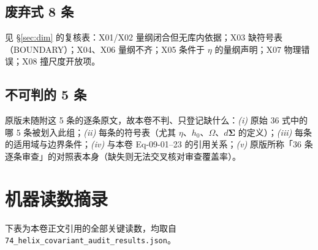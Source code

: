 \documentclass[UTF8,fontset=fandol,11pt]{ctexart}
\newcommand{\bx}{\boldsymbol}
\newcommand{\code}[1]{\texttt{#1}}
\begin{document}
\subsection{废弃式 8 条}
见 \S\ref{sec:dim} 的复核表：X01/X02 量纲闭合但无库内依据；X03 缺符号表（BOUNDARY）；X04、X06 量纲不齐；X05 条件于 $\eta$ 的量纲声明；X07 物理错误；X08 撞尺度开放项。

\subsection{不可判的 5 条}
原版未随附这 5 条的逐条原文，故本卷不判、只登记缺什么：\emph{(i)} 原始 36 式中的哪 5 条被划入此组；\emph{(ii)} 每条的符号表（尤其 $\eta$、$h_0$、$\Omega$、$d\bx\Sigma$ 的定义）；\emph{(iii)} 每条的适用域与边界条件；\emph{(iv)} 与本卷 Eq-09-01--23 的引用关系；\emph{(v)} 原版所称「36 条逐条审查」的对照表本身（缺失则无法交叉核对审查覆盖率）。

\section{机器读数摘录}
\label{app:b}

\noindent
下表为本卷正文引用的全部关键读数，均取自 \code{74\_helix\_covariant\_audit\_results.json}。
\end{document}
